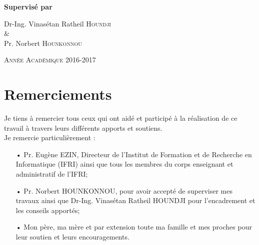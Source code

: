 \documentclass[12pt,a4paper]{article}
\begin{document}
\begin{titlepage}
		\vspace{1cm}{\scshape\Large Institut de Formation et de Recherche en Informatique (IFRI)\par}
		\vspace{1cm}{\scshape\Large Mémoire pour l'obtention du diplôme de Master en Systèmes d'Information et Réseaux Informatiques\par}
		\vspace{1.5cm}{\huge\bfseries Résolution de "Pigment Sequencing Problem" avec les algorithmes génétiques\par}
		\vfill
		\Large\textbf{Supervisé par}\par Dr-Ing. Vinasétan Ratheil \textsc{Houndji} \\ \& \\ Pr. Norbert \textsc{Hounkonnou} 
		\vfill
		{\large \scshape Année Académique 2016-2017 \par}
	\end{titlepage}

	\newpage
	\thispagestyle{empty}
	\null
	\newpage %
	
	\section*{Remerciements}
	
	\vspace{2.5cm}
	
	Je tiens à remercier tous ceux qui ont aidé et participé à la réalisation de ce travail à travers leurs différents apports et soutiens. \\
	\hspace*{.5cm}Je remercie particulièrement : \\
	\begin{itemize}
		\item[•] Pr. Eugène EZIN, Directeur de l'Institut de Formation et de Recherche en Informatique (IFRI) ainsi que tous les membres du corps enseignant et administratif de l'IFRI;
		\item[•] Pr. Norbert HOUNKONNOU, pour avoir accepté de superviser mes travaux ainsi que Dr-Ing. Vinasétan Ratheil HOUNDJI pour l'encadrement et les conseils apportés;
		\item[•] Mon père, ma mère et par extension toute ma famille et mes proches pour leur soutien et leurs encouragements. 
	\end{itemize}
	
\end{document}
